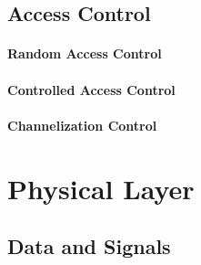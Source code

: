 \subsection{Access Control}
\paragraph{Random Access Control}
\paragraph{Controlled Access Control}
\paragraph{Channelization Control}
\section{Physical Layer}
\subsection{Data and Signals}
